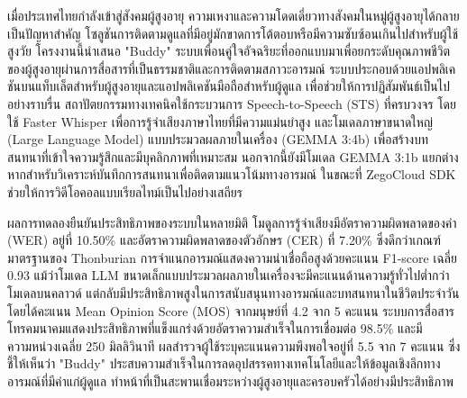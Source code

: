 \hspace*{1.6cm}เมื่อประเทศไทยกำลังเข้าสู่สังคมผู้สูงอายุ ความเหงาและความโดดเดี่ยวทางสังคมในหมู่ผู้สูงอายุได้กลายเป็นปัญหาสำคัญ โซลูชันการติดตามดูแลที่มีอยู่มักขาดการโต้ตอบหรือมีความซับซ้อนเกินไปสำหรับผู้ใช้สูงวัย โครงงานนี้นำเสนอ "Buddy" ระบบเพื่อนคู่ใจอัจฉริยะที่ออกแบบมาเพื่อยกระดับคุณภาพชีวิตของผู้สูงอายุผ่านการสื่อสารที่เป็นธรรมชาติและการติดตามสภาวะอารมณ์ ระบบประกอบด้วยแอปพลิเคชันบนแท็บเล็ตสำหรับผู้สูงอายุและแอปพลิเคชันมือถือสำหรับผู้ดูแล เพื่อช่วยให้การปฏิสัมพันธ์เป็นไปอย่างราบรื่น สถาปัตยกรรมทางเทคนิคใช้กระบวนการ Speech-to-Speech (STS) ที่ครบวงจร โดยใช้ Faster Whisper เพื่อการรู้จำเสียงภาษาไทยที่มีความแม่นยำสูง และโมเดลภาษาขนาดใหญ่ (Large Language Model) แบบประมวลผลภายในเครื่อง (GEMMA 3:4b) เพื่อสร้างบทสนทนาที่เข้าใจความรู้สึกและมีบุคลิกภาพที่เหมาะสม นอกจากนี้ยังมีโมเดล GEMMA 3:1b แยกต่างหากสำหรับวิเคราะห์บันทึกการสนทนาเพื่อติดตามแนวโน้มทางอารมณ์ ในขณะที่ ZegoCloud SDK ช่วยให้การวิดีโอคอลแบบเรียลไทม์เป็นไปอย่างเสถียร

\hspace*{1.6cm}ผลการทดลองยืนยันประสิทธิภาพของระบบในหลายมิติ โมดูลการรู้จำเสียงมีอัตราความผิดพลาดของคำ (WER) อยู่ที่ 10.50\% และอัตราความผิดพลาดของตัวอักษร (CER) ที่ 7.20\% ซึ่งดีกว่าเกณฑ์มาตรฐานของ Thonburian การจำแนกอารมณ์แสดงความน่าเชื่อถือสูงด้วยคะแนน F1-score เฉลี่ย 0.93 แม้ว่าโมเดล LLM ขนาดเล็กแบบประมวลผลภายในเครื่องจะมีคะแนนด้านความรู้ทั่วไปต่ำกว่าโมเดลบนคลาวด์ แต่กลับมีประสิทธิภาพสูงในการสนับสนุนทางอารมณ์และบทสนทนาในชีวิตประจำวัน โดยได้คะแนน Mean Opinion Score (MOS) จากมนุษย์ที่ 4.2 จาก 5 คะแนน ระบบการสื่อสารโทรคมนาคมแสดงประสิทธิภาพที่แข็งแกร่งด้วยอัตราความสำเร็จในการเชื่อมต่อ 98.5\% และมีความหน่วงเฉลี่ย 250 มิลลิวินาที ผลสำรวจผู้ใช้ระบุคะแนนความพึงพอใจอยู่ที่ 5.5 จาก 7 คะแนน ซึ่งชี้ให้เห็นว่า "Buddy" ประสบความสำเร็จในการลดอุปสรรคทางเทคโนโลยีและให้ข้อมูลเชิงลึกทางอารมณ์ที่มีค่าแก่ผู้ดูแล ทำหน้าที่เป็นสะพานเชื่อมระหว่างผู้สูงอายุและครอบครัวได้อย่างมีประสิทธิภาพ